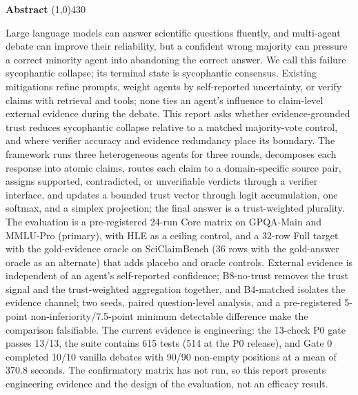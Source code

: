 \setlength{\headheight}{14pt}
\begin{center}
	{\huge \bf Abstract}
	\line(1,0){430}
\end{center}


Large language models can answer scientific questions fluently, and multi-agent debate can improve their reliability, but a confident wrong majority can pressure a correct minority agent into abandoning the correct answer. We call this failure sycophantic collapse; its terminal state is sycophantic consensus. Existing mitigations refine prompts, weight agents by self-reported uncertainty, or verify claims with retrieval and tools; none ties an agent's influence to claim-level external evidence during the debate. This report asks whether evidence-grounded trust reduces sycophantic collapse relative to a matched majority-vote control, and where verifier accuracy and evidence redundancy place its boundary. The framework runs three heterogeneous agents for three rounds, decomposes each response into atomic claims, routes each claim to a domain-specific source pair, assigns supported, contradicted, or unverifiable verdicts through a verifier interface, and updates a bounded trust vector through logit accumulation, one softmax, and a simplex projection; the final answer is a trust-weighted plurality. The evaluation is a pre-registered 24-run Core matrix on GPQA-Main and MMLU-Pro (primary), with HLE as a ceiling control, and a 32-row Full target with the gold-evidence oracle on SciClaimBench (36 rows with the gold-answer oracle as an alternate) that adds placebo and oracle controls. External evidence is independent of an agent's self-reported confidence; B8-no-trust removes the trust signal and the trust-weighted aggregation together, and B4-matched isolates the evidence channel; two seeds, paired question-level analysis, and a pre-registered 5-point non-inferiority/7.5-point minimum detectable difference make the comparison falsifiable. The current evidence is engineering: the 13-check P0 gate passes 13/13, the suite contains 615 tests (514 at the P0 release), and Gate 0 completed 10/10 vanilla debates with 90/90 non-empty positions at a mean of 370.8 seconds. The confirmatory matrix has not run, so this report presents engineering evidence and the design of the evaluation, not an efficacy result.

\clearpage
\setlength{\headheight}{12pt}
